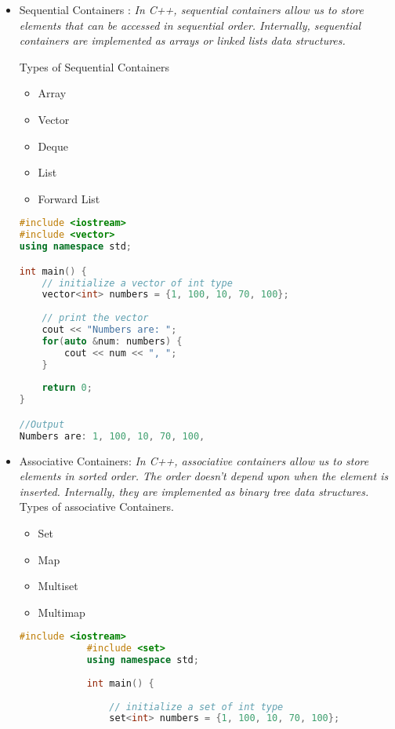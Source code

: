 \documentclass[11pt]{article}
\begin{document}
\begin{itemize}
	\item Sequential Containers : \textit{In C++, sequential containers allow us to store elements that can be accessed in sequential order.
		      Internally, sequential containers are implemented as arrays or linked lists data structures.}

	      Types of Sequential Containers
	      \begin{itemize}
		      \item Array
		      \item Vector
		      \item Deque
		      \item List
		      \item Forward List
	      \end{itemize}
	      \begin{lstlisting}[language=C++]
#include <iostream>
#include <vector>
using namespace std;

int main() {
	// initialize a vector of int type
	vector<int> numbers = {1, 100, 10, 70, 100};
	
	// print the vector
	cout << "Numbers are: ";
	for(auto &num: numbers) {
		cout << num << ", ";
	}
	
	return 0;
}

//Output
Numbers are: 1, 100, 10, 70, 100,
\end{lstlisting}

	\item Associative Containers: \textit{In C++, associative containers allow us to store elements in sorted order. The order doesn't
		      depend upon when the element is inserted. Internally, they are implemented as binary tree data structures.}
	      Types of associative Containers.
	      \begin{itemize}
		      \item Set
		      \item Map
		      \item Multiset
		      \item Multimap
	      \end{itemize}

	      \begin{lstlisting}[language= C++]
			#include <iostream>
			#include <set>
			using namespace std;
			
			int main() {
			
				// initialize a set of int type
				set<int> numbers = {1, 100, 10, 70, 100};
				

\end{lstlisting}
\end{itemize}
\end{document}

